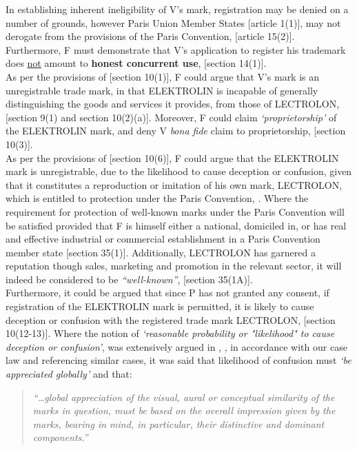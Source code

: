 \documentclass[11pt]{article}
\begin{document}
In establishing inherent ineligibility of V's mark, registration may be denied
on a number of grounds, however Paris Union Member States [article
1(1)]\cite{wipo83_paris_conve_protect_ip}, may not derogate from the provisions of
the Paris Convention, [article 15(2)]\cite{wto17_trips}. Furthermore, F must
demonstrate that V's application to register his trademark does \uline{not} amount to \textbf{honest concurrent use}, [section 14(1)]\cite{rsa93_tm_act}.\\

As per the provisions of [section 10(1)]\cite{rsa93_tm_act}, F could argue that
V's mark is an unregistrable  trade mark, in that ELEKTROLIN is incapable of
generally distinguishing the goods and services it provides, from those of
LECTROLON, [section 9(1) and section 10(2)(a)]\cite{rsa93_tm_act}. Moreover, F could claim \emph{`proprietorship'} of the ELEKTROLIN mark, and deny V \emph{bona fide} claim to proprietorship, [section 10(3)]\cite{rsa93_tm_act}.\\

As per the provisions of [section 10(6)]\cite{rsa93_tm_act}, F could argue that the ELEKTROLIN mark is unregistrable, due to the likelihood to cause deception or confusion, given that it constitutes a reproduction or imitation of his own mark, LECTROLON, which is entitled to protection under the Paris Convention, \cite{wipo83_paris_conve_protect_ip}. Where the requirement for protection of well-known marks under the Paris Convention will be satisfied provided that F is himself either a national, domiciled in, or has real and effective industrial or commercial establishment in a Paris Convention member state [section 35(1)]\cite{rsa93_tm_act}. Additionally, LECTROLON has garnered a reputation though sales, marketing and promotion in the relevant sector, it will indeed be considered to be \emph{``well-known''}, [section 35(1A)]\cite{rsa93_tm_act}.\\

Furthermore, it could be argued that since P has not granted any consent, if
registration of the ELEKTROLIN mark is permitted, it is likely to cause
deception or confusion with the registered trade mark LECTROLON, [section
10(12-13)]\cite{rsa93_tm_act}. Where the notion of \emph{`reasonable probability or
"likelihood" to cause deception or confusion'}, was extensively argued in
, \cite{harms01_cowbell_v_ics}, in accordance with
our case law and referencing similar cases, it was said that likelihood of
confusion must \emph{`be appreciated globally'} and that:
\begin{quote}
\emph{``\ldots{}global appreciation of the visual, aural or conceptual similarity of the marks in question, must be based on the overall impression given by the marks,
bearing in mind, in particular, their distinctive and dominant components.''}
\end{quote}
\end{document}
